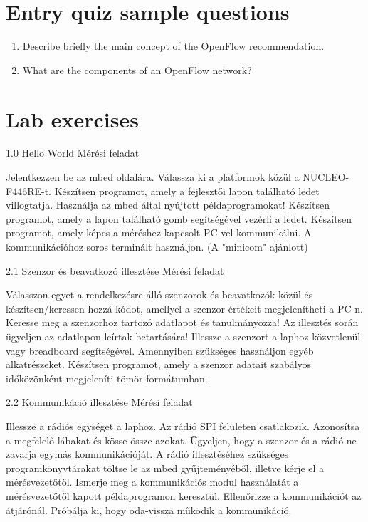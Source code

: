 \documentclass[a4paper]{article}
\begin{document}
\appendix

\section{Entry quiz sample questions}

\begin{enumerate}
    \item Describe briefly the main concept of the OpenFlow recommendation.
    \item What are the components of an OpenFlow network?
\end{enumerate}

\section{Lab exercises}

1.0 Hello World
Mérési feladat

Jelentkezzen be az mbed oldalára. Válassza ki a platformok közül a NUCLEO-F446RE-t.
Készítsen programot, amely a fejlesztői lapon található ledet villogtatja.
Használja az mbed által nyújtott példaprogramokat!
Készítsen programot, amely a lapon található gomb segítségével vezérli a ledet.
Készítsen programot, amely képes a méréshez kapcsolt PC-vel kommunikálni. A kommunikációhoz soros terminált
használjon. (A "minicom" ajánlott)

2.1 Szenzor és beavatkozó illesztése
Mérési feladat

Válasszon egyet a rendelkezésre álló szenzorok és beavatkozók közül és készítsen/keressen hozzá kódot, amellyel a
szenzor értékeit megjelenítheti a PC-n.
Keresse meg a szenzorhoz tartozó adatlapot és tanulmányozza! Az illesztés során ügyeljen az adatlapon leírtak
betartására!
Illessze a szenzort a laphoz közvetlenül vagy breadboard segítségével. Amennyiben szükséges használjon egyéb
alkatrészeket.
Készítsen programot, amely a szenzor adatait szabályos időközönként megjeleníti tömör formátumban.

2.2 Kommunikáció illesztése
Mérési feladat

Illessze a rádiós egységet a laphoz. Az rádió SPI felületen csatlakozik. Azonosítsa a megfelelő lábakat és kösse
össze azokat. Ügyeljen, hogy a szenzor és a rádió ne zavarja egymás kommunikációját.
A rádió illesztéséhez szükséges programkönyvtárakat töltse le az mbed gyűjteményéből, illetve kérje el a
mérésvezetőtől.
Ismerje meg a kommunikációs modul használatát a mérésvezetőtől kapott példaprogramon keresztül.
Ellenőrizze a kommunikációt az átjárónál. Próbálja ki, hogy oda-vissza működik a kommunikáció.
\end{document}
